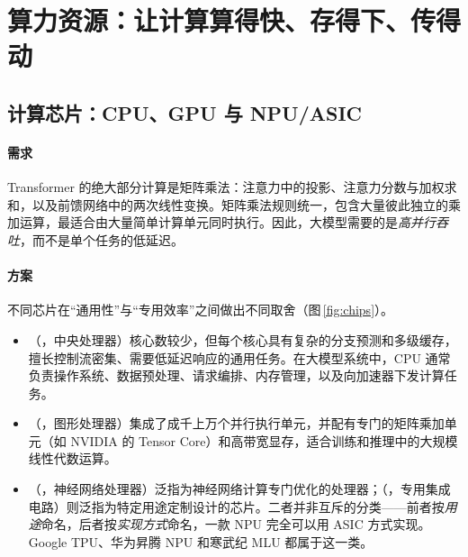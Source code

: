 \section{算力资源：让计算算得快、存得下、传得动}
\label{sec:hw}

\begin{guide}
\begin{minipage}[c]{0.66\linewidth}
\end{minipage}\hfill
\begin{minipage}[c]{0.3\linewidth}\centering{}\end{minipage}
\end{guide}

\subsection{计算芯片：CPU、GPU 与 NPU/ASIC}
\label{subsec:chips}

\paragraph{需求} Transformer 的绝大部分计算是矩阵乘法：注意力中的投影、注意力分数与加权求和，以及前馈网络中的两次线性变换。矩阵乘法规则统一，包含大量彼此独立的乘加运算，最适合由大量简单计算单元同时执行。因此，大模型需要的是\emph{高并行吞吐}，而不是单个任务的低延迟。

\paragraph{方案} 不同芯片在“通用性”与“专用效率”之间做出不同取舍（图\,\ref{fig:chips}）。
\begin{itemize}
  \item {}（，中央处理器）核心数较少，但每个核心具有复杂的分支预测和多级缓存，擅长控制流密集、需要低延迟响应的通用任务。在大模型系统中，CPU 通常负责操作系统、数据预处理、请求编排、内存管理，以及向加速器下发计算任务。
  \item {}（，图形处理器）集成了成千上万个并行执行单元，并配有专门的矩阵乘加单元（如 NVIDIA 的 Tensor Core）和高带宽显存，适合训练和推理中的大规模线性代数运算\cite{hwu2026pmpp}。
  \item {}（，神经网络处理器）泛指为神经网络计算专门优化的处理器；（，专用集成电路）则泛指为特定用途定制设计的芯片。二者并非互斥的分类——前者按\emph{用途}命名，后者按\emph{实现方式}命名，一款 NPU 完全可以用 ASIC 方式实现。Google TPU、华为昇腾 NPU 和寒武纪 MLU 都属于这一类。
\end{itemize}

